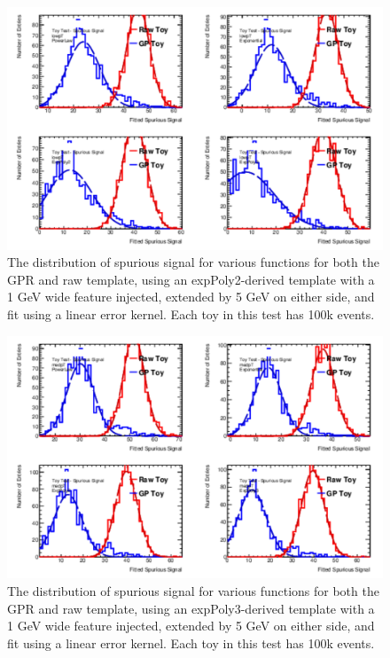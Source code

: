 \begin{figure} 
\begin{center}
  \includegraphics[width=\textwidth]{figures/background/gpr/validation/linear/ToyTest_FitSigVals_lowpT_100k_Sig_1s}   
\caption{The distribution of spurious signal for various functions for both the GPR and raw template, using an expPoly2-derived template with a 1 GeV wide feature injected, extended by 5 GeV on either side, and fit using a linear error kernel. Each toy in this test has 100k events.}
\label{fig:linearkernel_lowpt_100k_Sig_1s}
\end{center}
\end{figure}

\begin{figure} 
\begin{center}
  \includegraphics[width=\textwidth]{figures/background/gpr/validation/linear/ToyTest_FitSigVals_medpT_100k_Sig_1s}   
\caption{The distribution of spurious signal for various functions for both the GPR and raw template, using an expPoly3-derived template with a 1 GeV wide feature injected, extended by 5 GeV on either side, and fit using a linear error kernel. Each toy in this test has 100k events.}
\label{fig:linearkernel_medpt_100k_Sig_1s}
\end{center}
\end{figure}

